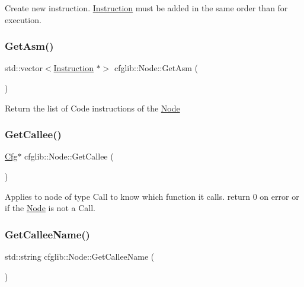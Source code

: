 Create new instruction. \hyperlink{classcfglib_1_1Instruction}{Instruction} must be added in the same order than for execution. \mbox{\label{classcfglib_1_1Node_a75ef37984de980ec3866b68eb23864ae}} 
\subsubsection{\texorpdfstring{Get\+Asm()}{GetAsm()}}
{\footnotesize\ttfamily std\+::vector$<$\hyperlink{classcfglib_1_1Instruction}{Instruction} $\ast$$>$ cfglib\+::\+Node\+::\+Get\+Asm (\begin{DoxyParamCaption}{ }\end{DoxyParamCaption})}

Return the list of Code instructions of the \hyperlink{classcfglib_1_1Node}{Node} \mbox{\label{classcfglib_1_1Node_af9e169489c3a49ea3e6ef95e6b24ac69}} 
\subsubsection{\texorpdfstring{Get\+Callee()}{GetCallee()}}
{\footnotesize\ttfamily \hyperlink{classcfglib_1_1Cfg}{Cfg}$\ast$ cfglib\+::\+Node\+::\+Get\+Callee (\begin{DoxyParamCaption}{ }\end{DoxyParamCaption})}

Applies to node of type Call to know which function it calls. return 0 on error or if the \hyperlink{classcfglib_1_1Node}{Node} is not a Call. \mbox{\label{classcfglib_1_1Node_af50258a896a1960fe337ce9bfb4c038e}} 
\subsubsection{\texorpdfstring{Get\+Callee\+Name()}{GetCalleeName()}}
{\footnotesize\ttfamily std\+::string cfglib\+::\+Node\+::\+Get\+Callee\+Name (\begin{DoxyParamCaption}{ }\end{DoxyParamCaption})}

